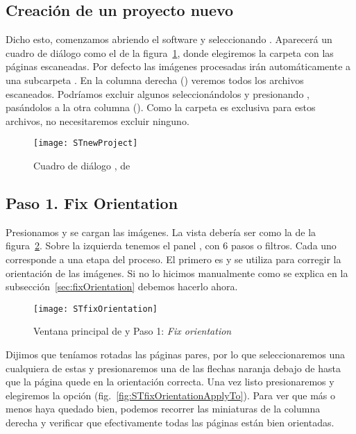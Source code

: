 \documentclass[%
	a5paper,
	10pt,
	twoside,
	openright,
	final,
]{memoir}
\begin{document}
	\subsection{Creación de un proyecto nuevo} Dicho esto, comenzamos abriendo el software y seleccionando . Aparecerá un cuadro de diálogo como el de la figura~\ref{fig:STnewProject}, donde elegiremos la carpeta con las páginas escaneadas. Por defecto las imágenes procesadas irán automáticamente a una subcarpeta . En la columna derecha () veremos todos los archivos escaneados. Podríamos excluir algunos seleccionándolos y presionando , pasándolos a la otra columna (). Como la carpeta  es exclusiva para estos archivos, no necesitaremos excluir ninguno.

	\begin{figure}
		\centering
		\texttt{[image: STnewProject]}
		\caption[Cuadro de diálogo New Project, de \scantailor]{Cuadro de diálogo , de \scantailor\label{fig:STnewProject}}
	\end{figure}

	\subsection{Paso 1. Fix Orientation\label{sec:STfixOrientation}} Presionamos  y se cargan las imágenes. La vista debería ser como la de la figura~\ref{fig:STfixOrientation}. Sobre la izquierda tenemos el panel , con 6 pasos o filtros. Cada uno corresponde a una etapa del proceso. El primero es  y se utiliza para corregir la orientación de las imágenes. Si no lo hicimos manualmente como se explica en la subsección~\ref{sec:fixOrientation} debemos hacerlo ahora.

	\begin{figure}
		\centering
		\texttt{[image: STfixOrientation]}
		\caption[Paso 1: \emph{Fix orientation}]{Ventana principal de \scantailor y Paso 1: \emph{Fix orientation}\label{fig:STfixOrientation}}
	\end{figure}

	Dijimos que teníamos rotadas las páginas pares, por lo que seleccionaremos una cualquiera de estas y presionaremos una de las flechas naranja debajo de  hasta que la página quede en la orientación correcta. Una vez listo presionaremos  y elegiremos la opción  (fig.~\ref{fig:STfixOrientationApplyTo}). Para ver que más o menos haya quedado bien, podemos recorrer las miniaturas de la columna derecha y verificar que efectivamente todas las páginas están bien orientadas.
\end{document}
